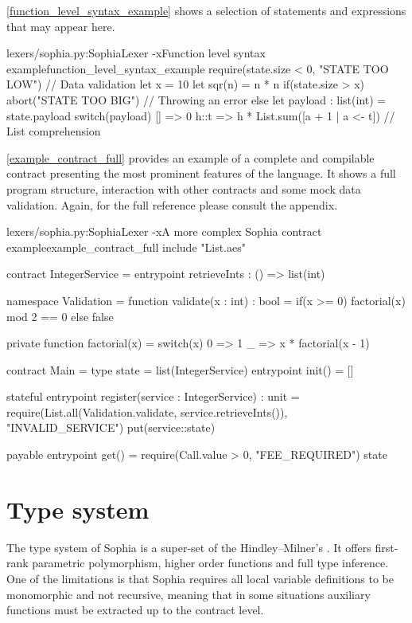\autoref{function_level_syntax_example} shows a selection of statements and
expressions that may appear here.

\begin{code}[H]{lexers/sophia.py:SophiaLexer -x}{Function level syntax
    example}{function_level_syntax_example}
require(state.size < 0, "STATE TOO LOW") // Data validation
let x = 10
let sqr(n) = n * n
if(state.size > x)
  abort("STATE TOO BIG") // Throwing an error
else
  let payload : list(int) = state.payload
  switch(payload)
    []   => 0
    h::t =>
      h * List.sum([a + 1 | a <- t]) // List comprehension
\end{code}


\autoref{example_contract_full} provides an example of a complete and compilable
contract presenting the most prominent features of the language. It shows a full
program structure, interaction with other contracts and some mock data
validation. Again, for the full reference please consult the appendix.

\begin{code}[!hb]{lexers/sophia.py:SophiaLexer -x}{A more complex Sophia contract example}{example_contract_full}
include "List.aes"

contract IntegerService =
  entrypoint retrieveInts : () => list(int)

namespace Validation =
  function validate(x : int) : bool =
    if(x >= 0)
      factorial(x) mod 2 == 0
    else false

  private function factorial(x) =
    switch(x)
      0 => 1
      _ => x * factorial(x - 1)

contract Main =
  type state = list(IntegerService)
  entrypoint init() = []

  stateful entrypoint register(service : IntegerService) : unit =
    require(List.all(Validation.validate, service.retrieveInts()),
            "INVALID_SERVICE")
    put(service::state)

  payable entrypoint get() =
    require(Call.value > 0, "FEE_REQUIRED")
    state
\end{code}

\section{Type system}

The type system of Sophia is a super-set of the Hindley--Milner's \cite{hindley,
  milner}. It offers first-rank parametric polymorphism, higher order functions
and full type inference. One of the limitations is that Sophia requires all
local variable definitions to be monomorphic and not recursive, meaning that in
some situations auxiliary functions must be extracted up to the contract level.

